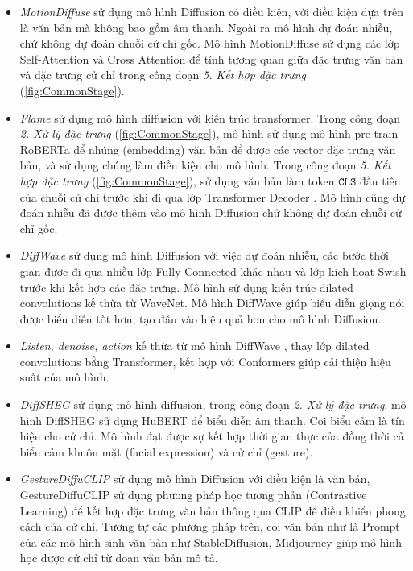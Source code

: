 \begin{itemize}
	\item \textit{MotionDiffuse} \cite{zhang2022motiondiffuse} sử dụng mô hình Diffusion có điều kiện, với điều kiện dựa trên là văn bản mà không bao gồm âm thanh. Ngoài ra mô hình dự đoán nhiễu, chứ không dự đoán chuỗi cử chỉ gốc. Mô hình MotionDiffuse sử dụng các lớp Self-Attention và Cross Attention để tính tương quan giữa đặc trưng văn bản và đặc trưng cử chỉ trong công đoạn \textit{5. Kết hợp đặc trưng} (\autoref{fig:CommonStage}).
	
	\item \textit{Flame} \cite{kim2023flame} sử dụng mô hình diffusion với kiến trúc transformer. Trong công đoạn \textit{2. Xử lý đặc trưng} (\autoref{fig:CommonStage}), mô hình sử dụng mô hình pre-train RoBERTa để nhúng (embedding) văn bản để được các vector đặc trưng văn bản, và sử dụng chúng làm điều kiện cho mô hình. 
	Trong công đoạn \textit{5. Kết hợp đặc trưng} (\autoref{fig:CommonStage}), sử dụng văn bản làm token $\texttt{CLS}$ đầu tiên của chuỗi cử chỉ trước khi đi qua lớp Transformer Decoder .  Mô hình cũng dự đoán nhiễu đã được thêm vào mô hình Diffusion chứ không dự đoán chuỗi cử chỉ gốc.
	
	\item \textit{DiffWave} \cite{kong2020diffwave} sử dụng mô hình Diffusion với việc dự đoán nhiễu, các bước thời gian được đi qua nhiều lớp Fully Connected khác nhau và lớp kích hoạt Swish trước khi kết hợp các đặc trưng. Mô hình sử dụng kiến trúc dilated convolutions kế thừa từ WaveNet. Mô hình DiffWave giúp biểu diễn giọng nói được biểu diễn tốt hơn, tạo đầu vào hiệu quả hơn cho mô hình Diffusion.
	
	\item \textit{Listen, denoise, action} \cite{alexanderson2022listen} kế thừa từ mô hình DiffWave \cite{kong2020diffwave}, thay lớp dilated convolutions bằng Transformer, kết hợp với Conformers giúp cải thiện hiệu suất của mô hình.
	
	\item \textit{DiffSHEG} \cite{chen2024diffsheg} sử dụng mô hình diffusion, trong công đoạn \textit{2. Xử lý đặc trưng}, mô hình DiffSHEG sử dụng HuBERT để biểu diễn âm thanh. Coi biểu cảm là tín hiệu cho cử chỉ. Mô hình đạt được sự kết hợp thời gian thực của đồng thời cả biểu cảm khuôn mặt (facial expression) và cử chỉ (gesture).
	
	\item \textit{GestureDiffuCLIP} \cite{ao2023gesturediffuclip} sử dụng mô hình Diffusion với điều kiện là văn bản, GestureDiffuCLIP sử dụng phương pháp học tương phản (Contrastive Learning) để kết hợp đặc trưng văn bản thông qua CLIP để điều khiển phong cách của cử chỉ. Tương tự các phương pháp trên, coi văn bản như là Prompt của các mô hình sinh văn bản như StableDiffusion, Midjourney giúp mô hình học được cử chỉ từ đoạn văn bản mô tả.
	

\end{itemize}
